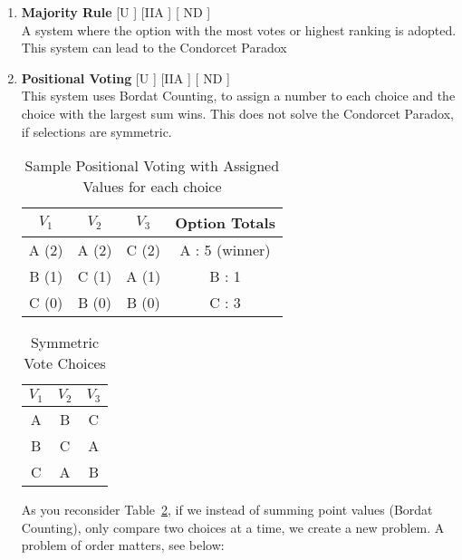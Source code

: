 \documentclass[twoside]{article}
\begin{document}
\begin{enumerate}
    \item \textbf{Majority Rule} [U \xmark] [IIA \cmark ] [ ND \cmark ]
    \\ A system where the option with the most votes or highest ranking is adopted.  This system can lead to the Condorcet Paradox
    \item \textbf{Positional Voting} [U \xmark] [IIA \cmark ] [ ND \cmark ]
    \\ This system uses Bordat Counting, to assign a number to each choice and the choice with the largest sum wins.  This does not solve the Condorcet Paradox, if selections are symmetric.
    
    \begin{table}[H]
    \centering
     \begin{tabular}{ccc|c}
     $V_1$ & $V_2$ & $V_3$ & Option Totals \\ \hline
     A (2) & A (2) & C (2) & A : 5 (winner) \\
     B (1) & C (1) & A (1) & B : 1 \\
     C (0) & B (0) & B (0) & C : 3 
    \end{tabular}
    \caption{Sample Positional Voting with Assigned Values for each choice}
    \label{tab:ex4}
\end{table}
    
    
\begin{table}[H]
    \centering
     \begin{tabular}{ccc}
     $V_1$ & $V_2$ & $V_3$  \\ \hline
     A  & B & C \\
     B  & C  & A \\
     C  & A  & B   
    \end{tabular}
    \caption{Symmetric Vote Choices}
    \label{tab:ex9}
\end{table}

As you reconsider Table~\ref{tab:ex9}, if we instead of summing point values (Bordat Counting), only compare two choices at a time, we create a new problem.  A problem of order matters, see below:

\begin{center}
\end{center}
\end{enumerate}
\end{document}
